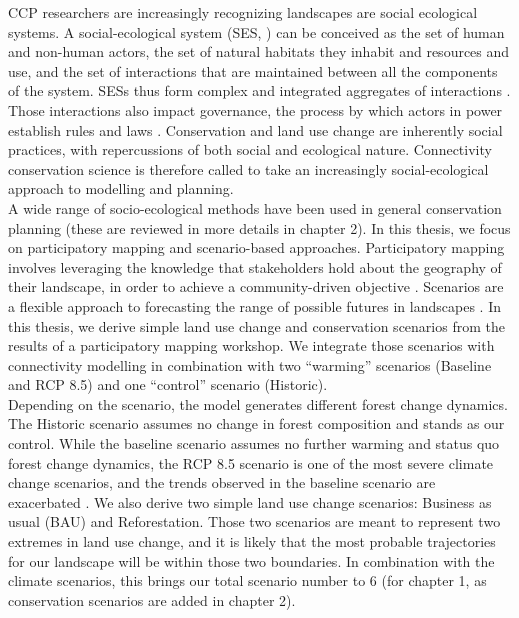 \documentclass[12pt,Bold,TexShade]{thesis/mcgilletdclass}
\begin{document}
{CCP researchers are increasingly recognizing landscapes are social ecological systems. A social-ecological system (SES, \cite{ostrom_general_2009}) can be conceived  as the set of human and non-human actors, the set of natural habitats they inhabit and resources and use, and the set of interactions that are maintained between all the components of the system. SESs thus form complex and integrated aggregates of interactions \citep{hinkel_enhancing_2014}. Those interactions also impact governance, the process by which actors in power establish rules and laws \citep{bissonnette_comparing_2018}. Conservation and land use change are inherently social practices, with repercussions of both social and ecological nature. Connectivity conservation science is therefore called to take an increasingly social-ecological approach to modelling and planning. \\

A wide range of socio-ecological methods have been used in general conservation planning (these are reviewed in more details in chapter 2). In this thesis, we focus on participatory mapping and scenario-based approaches. Participatory mapping involves leveraging the knowledge that stakeholders hold about the geography of their landscape, in order to achieve a community-driven objective  \citep{plieninger_assessing_2013}. Scenarios are a flexible approach to forecasting the range of possible futures in landscapes \citep{peterson_scenario_2003}. In this thesis, we derive simple land use change and conservation scenarios from the results of a participatory mapping workshop. We integrate those scenarios with connectivity modelling in combination with two “warming” scenarios (Baseline and RCP 8.5) and one “control” scenario (Historic). \\

Depending on the scenario, the model generates different forest change dynamics. The Historic scenario assumes no change in forest composition and stands as our control. While the baseline scenario assumes no further warming and status quo forest change dynamics, the RCP 8.5 scenario is one of the most severe climate change scenarios, and the trends observed in the baseline scenario are exacerbated \cite{ipcc_summary_2013}. We also derive two simple land use change scenarios: Business as usual (BAU) and Reforestation. Those two scenarios are meant to represent two extremes in land use change, and it is likely that the most probable trajectories for our landscape will be within those two boundaries. In combination with the climate scenarios, this brings our total scenario number to 6 (for chapter 1, as conservation scenarios are added in chapter 2). \\

}
\end{document}
